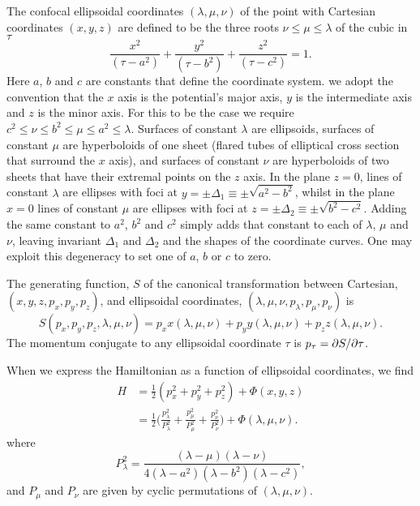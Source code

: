 \documentclass[useAMS,usenatbib,fleqn,a4paper]{mn2e}
\def\half{{\textstyle{\frac12}}}
\begin{document}
The confocal ellipsoidal coordinates $(\lambda,\mu,\nu)$ of the point with
Cartesian coordinates $(x,y,z)$ are defined to be the three roots
$\nu\le\mu\le\lambda$ of the
cubic in $\tau$
\begin{equation}
\frac{x^2}{(\tau-a^2)}+\frac{y^2}{(\tau-b^2)}+\frac{z^2}{(\tau-c^2)} = 1.
\end{equation}
 Here $a$, $b$ and $c$ are constants that define the coordinate system. we
adopt the convention that the $x$ axis is the potential's major axis,
$y$ is the intermediate axis and $z$ is the minor axis. For this to be the
case we require
$c^2\leq\nu\leq b^2\leq\mu\leq a^2\leq\lambda$. Surfaces of constant
$\lambda$ are ellipsoids, surfaces of constant $\mu$ are hyperboloids of one
sheet (flared tubes of elliptical cross section that surround the $x$ axis),
and surfaces of constant $\nu$ are hyperboloids of two sheets that have their
extremal points on the $z$ axis. In the plane $z=0$, lines of constant
$\lambda$ are ellipses with foci at $y=\pm\Delta_1\equiv\pm\sqrt{a^2-b^2}$,
whilst in the plane $x=0$ lines of constant $\mu$ are ellipses with foci at
$z=\pm\Delta_2\equiv\pm\sqrt{b^2-c^2}$. Adding the same constant to $a^2$,
$b^2$ and $c^2$ simply adds that constant to each of $\lambda$, $\mu$ and
$\nu$, leaving invariant $\Delta_1$ and $\Delta_2$ and the shapes of the
coordinate curves. One may exploit this degeneracy to set one of $a$, $b$ or
$c$ to zero.

 The generating function, $S$ of the canonical transformation between Cartesian,
$(x,y,z,p_x,p_y,p_z)$, and ellipsoidal coordinates,
$(\lambda,\mu,\nu,p_\lambda,p_\mu,p_\nu)$ is
\begin{equation}
S(p_x,p_y,p_z,\lambda,\mu,\nu) = p_x x(\lambda,\mu,\nu)
+p_y y(\lambda,\mu,\nu) 
+p_z z(\lambda,\mu,\nu).
\end{equation}
The momentum conjugate to any ellipsoidal coordinate $\tau$ is $p_\tau =
\partial S/\partial \tau$. 

When we express the Hamiltonian as a function of
ellipsoidal coordinates, we find
\begin{equation}
\begin{split}
H &= \half(p_x^2+p_y^2+p_z^2)+\Phi(x,y,z)
\\&=\half\Big(\frac{p_\lambda^2}{P_\lambda^2}+\frac{p_\mu^2}{P_\mu^2}+\frac{p_\nu^2}{P_\nu^2}\Big)+\Phi(\lambda,\mu,\nu).
\end{split}
\label{Eq::Hamiltonian}
\end{equation}
where
\begin{equation}
P^2_\lambda = \frac{(\lambda-\mu)(\lambda-\nu)}{4(\lambda-a^2)(\lambda-b^2)(\lambda-c^2)},
\end{equation}
and $P_\mu$ and $P_\nu$ are given by cyclic permutations of $(\lambda,\mu,\nu)$.
\end{document}
